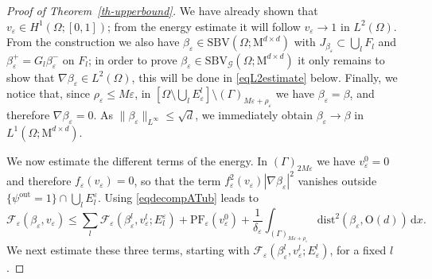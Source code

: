 \documentclass[a4paper,reqno]{amsart}
\newcommand{\SBV}{\mathrm{SBV}}
\newcommand{\SBVG}{\mathrm{SBV}_{\mathcal{G}}}
\newcommand\dist{{\mathrm{dist}}}
\newcommand\out{{\mathrm{out}}}
\newcommand\eps{{\varepsilon}}
\theoremstyle{remark}
\newcommand\dx{{\,\mathrm{d}x}}
\newcommand{\F}{\mathcal{F}}
\newcommand{\On}{\mathrm{O}(d)}
\newcommand{\Mno}{\mathrm{M}^{d\times d}}
\newcommand\AT{\text{PF}}
\numberwithin{equation}{section}
\begin{document}
\begin{proof}[Proof of Theorem~\ref{th-upperbound}]
	
	
	We have already shown that $v_\eps\in H^1(\Omega;[0,1])$; from the energy estimate it will follow $v_\eps\to1$ in $L^2(\Omega)$. From the construction we also have $\beta_\eps\in \SBV(\Omega;\Mno)$ with $J_{\beta_\eps}\subset \bigcup_l F_l$
	and $\beta_\eps^+=G_l\beta_\eps^-$ on $F_l$; in order to prove $\beta_\eps\in \SBVG(\Omega;\Mno)$ it only remains to show that $\nabla\beta_\eps\in L^2(\Omega)$, this will be done in  \eqref{eqL2estimate} below. Finally, we notice that, since $\rho_\eps\le M\eps$, in
	$\left[\Omega\setminus \bigcup_l E^l_\eps \right]\setminus (\Gamma)_{M\eps+\rho_\eps}$ we have
	$\beta_\eps=\beta$, and therefore $\nabla \beta_\eps=0$.  As
	$\|\beta_\eps\|_{L^\infty}\le\sqrt d$,  we immediately obtain $\beta_\eps\to\beta$ in $L^1(\Omega;\Mno)$.

	We now estimate the different terms of the energy.
	In $(\Gamma)_{2M\eps}$ we have
	$v_\eps^0=0$ and therefore
	$f_\eps(v_\eps)=0$, so that the term
	$f^2_\eps(v_\eps)|\nabla\beta_\eps|^2$ vanishes outside $\{\psi^\out=1\}\cap\bigcup_l E_l^\eps$.
	Using
	\eqref{eqdecompATub} leads to
	\begin{equation}\label{equbdecdomfct}
		\F_\eps(\beta_\eps, v_\eps)
		\le \sum_l
		\F_\eps(\beta_\eps^l,v^l_\eps;E_l^\eps)+\AT_\eps(v_\eps^0)
		+\frac1{\delta_\eps} \int_{(\Gamma)_{M\eps+\rho_\eps}}
		\dist^2(\beta_\eps, \On)\dx.
	\end{equation}
	We next estimate these three terms,  starting with $\F_\eps(\beta_\eps^l,v^l_\eps;E^l_\eps)$, for a fixed $l$.


\end{proof}
\end{document}
